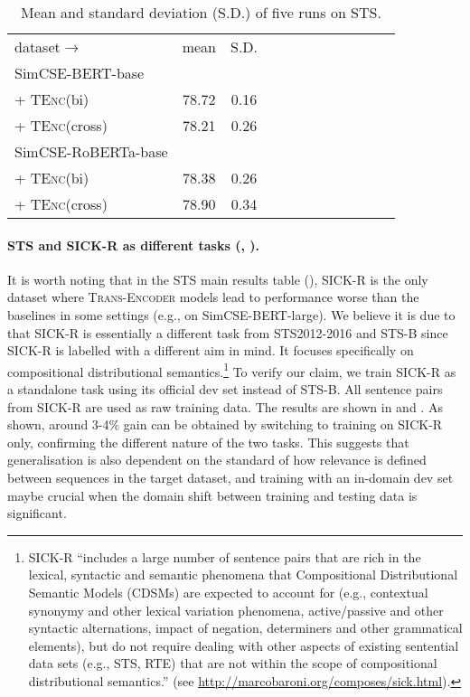\documentclass{article} \usepackage{iclr2021_conference,times}
\newcommand{\modelname}{\textsc{Trans-Encoder}\xspace}
\newcommand{\tenc}{\textsc{TEnc}\xspace}
\begin{document}
\begin{table}[!t] \setlength{\tabcolsep}{3.6pt}
\centering
\begin{tabular}{lccccccccccc}
\cmidrule[1.5pt]{1-10}
 dataset$\rightarrow$  & mean & S.D. & \\
\cmidrule[1.0pt]{1-10}
 SimCSE-BERT-base \\
 + \tenc (bi) & 78.72 & 0.16 \\
 + \tenc (cross) & 78.21 & 0.26  \\
  \cmidrule[.5pt]{1-10}
 SimCSE-RoBERTa-base     \\
 + \tenc (bi) & 78.38 & 0.26 \\
 + \tenc (cross) &  78.90 & 0.34  \\
  \cmidrule[1.5pt]{1-10}
\end{tabular}
\caption{Mean and standard deviation (S.D.) of five runs on STS.}
\label{tab:standard_sd}
\end{table}


\paragraph{STS and SICK-R as different tasks (, ).}
It is worth noting that in the STS main results table (), SICK-R is the only dataset where \modelname models lead to performance worse than the baselines in some settings (e.g., on SimCSE-BERT-large). We believe it is due to that SICK-R is essentially a different task from STS2012-2016 and STS-B since SICK-R is labelled with a different aim in mind. It focuses specifically on compositional distributional semantics.\footnote{SICK-R ``includes a large number of sentence pairs that are rich in the lexical, syntactic and semantic phenomena that Compositional Distributional Semantic Models (CDSMs) are expected to account for (e.g., contextual synonymy and other lexical variation phenomena, active/passive and other syntactic alternations, impact of negation, determiners and other grammatical elements), but do not require dealing with other aspects of existing sentential data sets (e.g., STS, RTE) that are not within the scope of compositional distributional semantics.'' (see \url{http://marcobaroni.org/composes/sick.html}).} To verify our claim, we train SICK-R as a standalone task using its official dev set instead of STS-B. All sentence pairs from SICK-R are used as raw training data. 
The results are shown in  and . 
As shown, around 3-4\% gain can be obtained by switching to training on SICK-R only, confirming the different nature of the two tasks. 
This suggests that generalisation is also dependent on the standard of how relevance is defined between sequences in the target dataset, and training with an in-domain dev set maybe crucial when the domain shift between training and testing data is significant.
\end{document}
